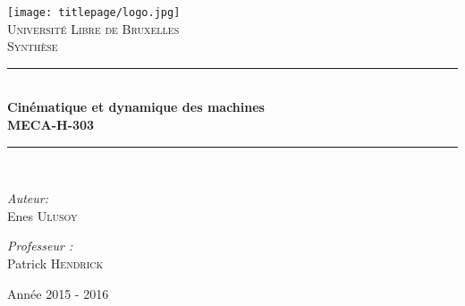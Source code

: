 \AddToShipoutPicture*{\BackgroundPic}
\begin{titlepage}
	\begin{center}	
			
		\newcommand{\HRule}{\rule{\linewidth}{0.5mm}}   			            %
		\texttt{[image: titlepage/logo.jpg]}~\\[1cm]				%
			
			\textsc{\LARGE Université Libre de Bruxelles}\\[1.5cm]
			\textsc{\Large Synthèse}\\[0.5cm]
			
			\HRule \\[0.4cm]
			{ \huge \bfseries Cinématique et dynamique des machines\ \\MECA-H-303 \\[0.4cm] }
			
			
			\HRule \\[1.5cm]
			\begin{minipage}{0.6\textwidth}
				\begin{flushleft} \large
					\emph{Auteur:}\\
					Enes \textsc{Ulusoy}\\
				\end{flushleft}
			\end{minipage}
			\begin{minipage}{0.25\textwidth}
				\large
				\emph{Professeur :}\\
				Patrick \textsc{Hendrick}
			\end{minipage}
			
			\vfill
			
			{\large Année 2015 - 2016}
			
		\end{center}
	\end{titlepage}
